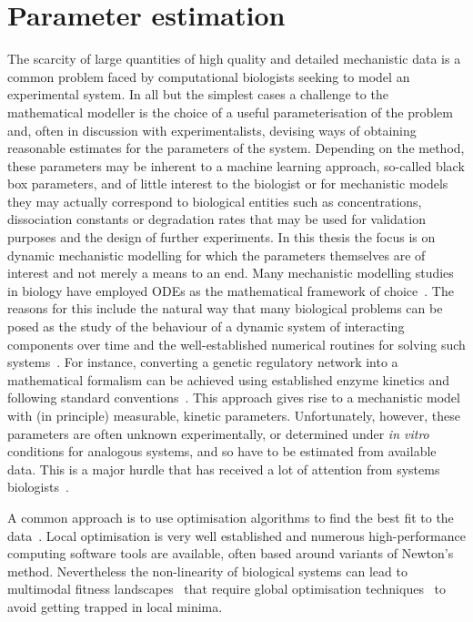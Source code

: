 \section{Parameter estimation}
The scarcity of large quantities of high quality and detailed mechanistic data is a common problem faced by computational biologists seeking to model an experimental system.
In all but the simplest cases a challenge to the mathematical modeller is the choice of a useful parameterisation of the problem and, often in discussion with experimentalists, devising ways of obtaining reasonable estimates for the parameters of the system.
Depending on the method, these parameters may be inherent to a machine learning approach, so-called black box parameters, and of little interest to the biologist or for mechanistic models they may actually correspond to biological entities such as concentrations, dissociation constants or degradation rates that may be used for validation purposes and the design of further experiments.
In this thesis the focus is on dynamic mechanistic modelling for which the parameters themselves are of interest and not merely a means to an end.
Many mechanistic modelling studies in biology have employed ODEs as the mathematical framework of choice~\cite{alon2006,vanmourik2010,song2012,murray2013}.
The reasons for this include the natural way that many biological problems can be posed as the study of the behaviour of a dynamic system of interacting components over time and the well-established numerical routines for solving such systems~\cite{sundials2005}.
For instance, converting a genetic regulatory network into a mathematical formalism can be achieved using established enzyme kinetics and following standard conventions~\cite{alon2006}.
This approach gives rise to a mechanistic model with (in principle) measurable, kinetic parameters.
Unfortunately, however, these parameters are often unknown experimentally, or determined under \emph{in vitro} conditions for analogous systems, and so have to be estimated from available data.
This is a major hurdle that has received a lot of attention from systems biologists~\cite{mendes1998,moles2003,ashyraliyev2009}.

A common approach is to use optimisation algorithms to find the best fit to the data~\cite{banga2008,ashyraliyev2009,dalchau2012}.
Local optimisation is very well established and numerous high-performance computing software tools are available, often based around variants of Newton's method.
Nevertheless the non-linearity of biological systems can lead to multimodal fitness landscapes~\cite{calderhead2009} that require global optimisation techniques~\cite{floudas2009,moles2003,mendes1998} to avoid getting trapped in local minima.

